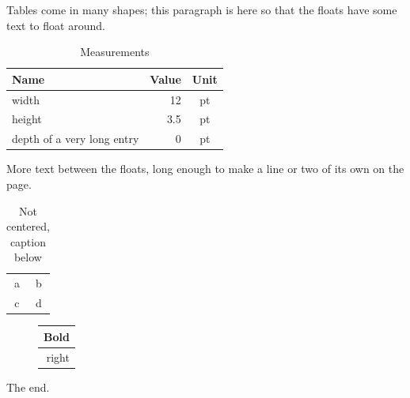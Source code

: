 \documentclass[11pt]{article}
\begin{document}
Tables come in many shapes; this paragraph is here so that the floats have some text to float around.

\begin{table}[h]
\centering
\caption{Measurements}\label{tab:m}
\begin{tabular}{lrc}
\hline\hline
\textbf{Name} & \textbf{Value} & Unit \\
\hline
width & 12 & pt \\
height & 3.5 & pt \\
depth of a very long entry & 0 & pt\\
\hline
\end{tabular}
\end{table}

More text between the floats, long enough to make a line or two of its own on the page.

\begin{table}[h]
\begin{tabular}{cc}
a & b \\
c & d
\end{tabular}
\caption{Not centered, caption below}
\end{table}

\begin{figure}[h]
\centering
\begin{tabular}{r}
\textbf{Bold} \\
\hline
right
\end{tabular}
\end{figure}

The end.
\end{document}
